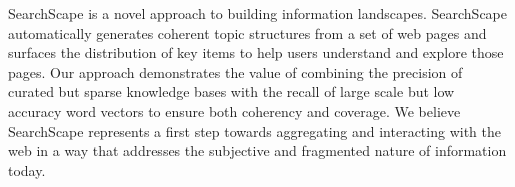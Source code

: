 

SearchScape is a novel approach to building information landscapes. SearchScape automatically generates coherent topic structures from a set of web pages and surfaces the distribution of key items to help users understand and explore those pages. Our approach demonstrates the value of combining the precision of curated but sparse knowledge bases with the recall of large scale but low accuracy word vectors to ensure both coherency and coverage. We believe SearchScape represents a first step towards aggregating and interacting with the web in a way that addresses the subjective and fragmented nature of information today.





